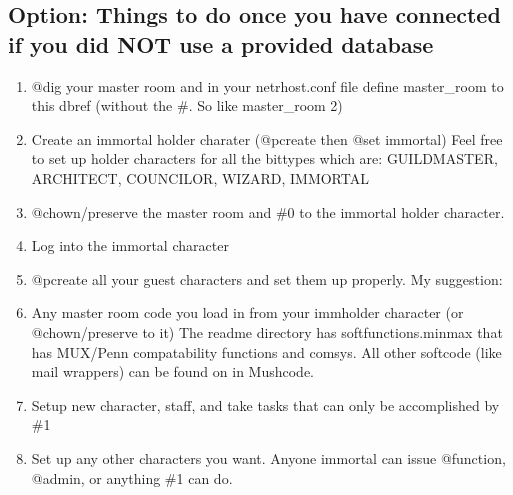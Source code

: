 \documentclass[letterpaper,10pt,english]{sphinxmanual}
\begin{document}
\subsection{Option: Things to do once you have connected if you did NOT use a provided database}
\label{\detokenize{install:option-things-to-do-once-you-have-connected-if-you-did-not-use-a-provided-database}}\begin{enumerate}
%
\item {} 
\sphinxAtStartPar
@dig your master room and in your netrhost.conf file define master\_room to this dbref (without the \#.  So like master\_room 2)

\item {} 
\sphinxAtStartPar
Create an immortal holder charater (@pcreate then @set immortal) Feel free to set up holder characters for all the bittypes which are: GUILDMASTER, ARCHITECT, COUNCILOR, WIZARD, IMMORTAL

\item {} 
\sphinxAtStartPar
@chown/preserve the master room and \#0 to the immortal holder character.

\item {} 
\sphinxAtStartPar
Log into the immortal character

\item {} 
\sphinxAtStartPar
@pcreate all your guest characters and set them up properly.  My suggestion:

\begin{sphinxVerbatim}[commandchars=\\\{\}]
  

         
\end{sphinxVerbatim}

\item {} 
\sphinxAtStartPar
Any master room code you load in from your immholder character (or @chown/preserve to it) The readme directory has softfunctions.minmax that has MUX/Penn compatability functions and comsys.  All other softcode (like mail wrappers) can be found on  in Mushcode.

\item {} 
\sphinxAtStartPar
Setup new character, staff, and take tasks that can only be accomplished by \#1

\item {} 
\sphinxAtStartPar
Set up any other characters you want.  Anyone immortal can issue @function, @admin, or anything \#1 can do.

\end{enumerate}
\end{document}
